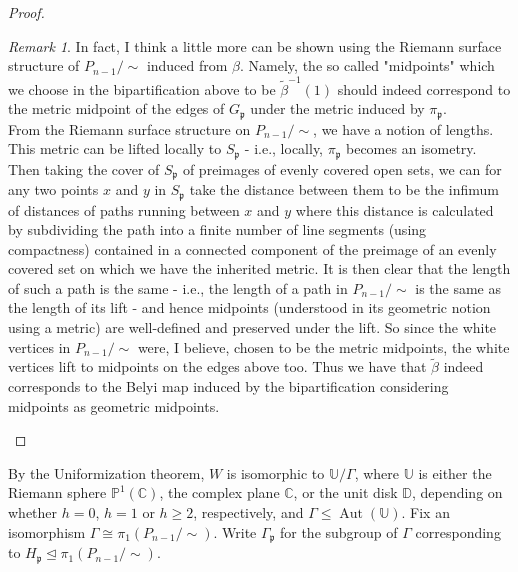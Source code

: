 \documentclass[reqno]{amsart}
\theoremstyle{definition}
\theoremstyle{remark}
\newtheorem*{remark}{Remark}
\DeclareMathOperator{\Aut}{Aut}
\begin{document}
\begin{proof}
\begin{remark}
    In fact, I think a little more can be shown
    using the Riemann surface structure
    of $P_{n-1} / \sim$ induced from
    $\beta$. Namely, the so called "midpoints" which
    we choose in the bipartification above
    to be $\tilde{\beta}^{-1}(1)$ should indeed correspond to the metric midpoint of the edges
    of $G_{\mathfrak{p}}$ under the
    metric induced by $\pi_{\mathfrak{p}}$.\\
     From the Riemann surface
         structure on $P_{n-1}/\sim$, we
         have a notion of lengths. This metric can be
         lifted locally to $S_{\mathfrak{p}}$ - i.e.,
          locally, $\pi_{\mathfrak{p}}$ becomes an
          isometry.
         Then taking the cover of
         $S_{\mathfrak{p}}$ of preimages
         of evenly covered open sets, we can
         for any two points $x$ and $y$ in $S_{\mathfrak{p}}$ take the distance between
         them to be the infimum of distances of
         paths running between $x$ and $y$ where
         this distance is calculated by subdividing
         the path into a finite number of line segments (using compactness) contained in a connected
         component of the preimage of an evenly covered set on which we have the inherited metric. It is then clear that
         the length of such a path is the same - i.e.,
         the length of a path in
         $P_{n-1}/\sim$ is the same as the
         length of its lift - and hence midpoints (understood in its geometric notion using a metric) are well-defined and preserved
         under the lift. So since the white vertices
         in $P_{n-1}/\sim$ were, I believe, chosen
         to be the metric midpoints, the white
         vertices lift to midpoints on the edges
         above too.
         Thus we have that $\tilde{\beta}$ indeed
         corresponds to the Belyi map induced by
         the bipartification considering
         midpoints as geometric midpoints.
\end{remark}
         
    \end{proof}
    
By the Uniformization theorem, $W$ is isomorphic to
$\mathbb{U}/ \Gamma$, where $\mathbb{U}$ is either the Riemann
sphere $\mathbb{P}^1 (\mathbb{C})$, the complex plane $\mathbb{C}$,
or the unit disk $\mathbb{D}$, depending on whether
$h = 0$, $h=1$ or $h\geq 2$, respectively, and
$\Gamma \leq \Aut (\mathbb{U})$. Fix an isomorphism
$\Gamma \cong \pi_1 (P_{n-1}/\sim)$. Write $\Gamma_{\mathfrak{p}}$ for the subgroup of $\Gamma$ corresponding
to $H_{\mathfrak{p}} \trianglelefteq \pi_1 (P_{n-1}/\sim)$.
\end{document}
